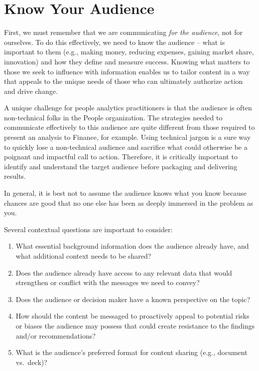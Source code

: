 \documentclass[
]{book}
\providecommand{\tightlist}{%
  \setlength{\itemsep}{0pt}\setlength{\parskip}{0pt}}
\begin{document}
\hypertarget{know-your-audience}{%
\section{Know Your Audience}\label{know-your-audience}}

First, we must remember that we are communicating \emph{for the audience}, not for ourselves. To do this effectively, we need to know the audience -- what is important to them (e.g., making money, reducing expenses, gaining market share, innovation) and how they define and measure success. Knowing what matters to those we seek to influence with information enables us to tailor content in a way that appeals to the unique needs of those who can ultimately authorize action and drive change.

A unique challenge for people analytics practitioners is that the audience is often non-technical folks in the People organization. The strategies needed to communicate effectively to this audience are quite different from those required to present an analysis to Finance, for example. Using technical jargon is a sure way to quickly lose a non-technical audience and sacrifice what could otherwise be a poignant and impactful call to action. Therefore, it is critically important to identify and understand the target audience before packaging and delivering results.

In general, it is best not to assume the audience knows what you know because chances are good that no one else has been as deeply immersed in the problem as you.

Several contextual questions are important to consider:

\begin{enumerate}
\def\labelenumi{\arabic{enumi}.}
\tightlist
\item
  What essential background information does the audience already have, and what additional context needs to be shared?
\item
  Does the audience already have access to any relevant data that would strengthen or conflict with the messages we need to convey?
\item
  Does the audience or decision maker have a known perspective on the topic?
\item
  How should the content be messaged to proactively appeal to potential risks or biases the audience may possess that could create resistance to the findings and/or recommendations?
\item
  What is the audience's preferred format for content sharing (e.g., document vs.~deck)?
\end{enumerate}
\end{document}
